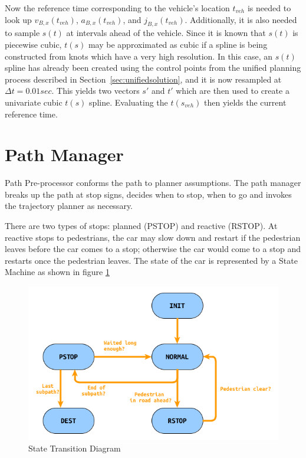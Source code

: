 \documentclass[letterpaper, 10 pt, conference]{ieeeconf}  %
\begin{document}
Now the reference time corresponding to the vehicle's location $t_{veh}$ is needed to look up $v_{B,x}(t_{veh})$, $a_{B,x}(t_{veh})$, and $j_{B,x}(t_{veh})$.
Additionally, it is also needed to sample $s(t)$ at intervals ahead of the vehicle.
Since it is known that $s(t)$ is piecewise cubic, $t(s)$ may be approximated as cubic if a spline is being constructed from knots which have a very high resolution.
In this case, an $s(t)$ spline has already been created using the control points from the unified planning process described in Section~\ref{sec:unifiedsolution}, and it is now resampled at $\Delta t = 0.01 sec$.
This yields two vectors $s'$ and $t'$ which are then used to create a univariate cubic $t(s)$ spline.
Evaluating the $t(s_{veh})$ then yields the current reference time.


\section{Path Manager} \label{sec:pathmanager}


Path Pre-processor conforms the path to planner assumptions.
The path manager breaks up the
path at stop signs, decides when to stop, when to go and invokes the trajectory planner
as necessary.

There are two types of stops: planned (PSTOP) and reactive (RSTOP).
At reactive stops
to pedestrians, the car may slow down and restart if the pedestrian leaves before the
car comes to a stop; otherwise the car would come to a stop and restarts once the 
pedestrian leaves.
The state of the car is represented by a State Machine as shown in figure \ref{fig:st}

\begin{figure}[thpb]
  \centering
  \includegraphics[width=1.0\columnwidth]{graphics/StateMachineSimple.png}
  \caption{State Transition Diagram}
  \label{fig:st}
\end{figure}
\end{document}
